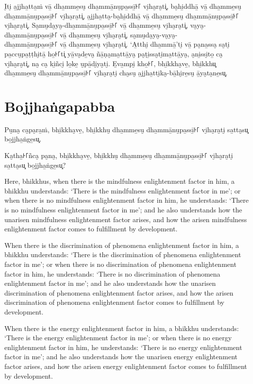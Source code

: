 I̮ti̮ a̱jjha̱tta̱ṁ vā̱ dha̱mme̱su̮ dha̱mmā̱nu̮pa̱ssī̱꜔꜒ vi̮ha̮ra̮ti͓,
ba̮hi̱ddhā̱ vā̱ dha̱mme̱su̮ dha̱mmā̱nu̮pa̱ssī̱꜔꜒ vi̮ha̮ra̮ti͓,
a̱jjha̱tta̮-ba̮hi̱ddhā̱ vā̱ dha̱mme̱su̮ dha̱mmā̱nu̮pa̱ssī̱꜔꜒ vi̮ha̮ra̮ti͓.
Sa̮mu̮da̮ya̮-dha̱mmā̱nu̮pa̱ssī̱꜔꜒ vā̱ dha̱mme̱su̮ vi̮ha̮ra̮ti͓,
va̮ya̮-dha̱mmā̱nu̮pa̱ssī̱꜔꜒ vā̱ dha̱mme̱su̮ vi̮ha̮ra̮ti͓,
sa̮mu̮da̮ya̮-va̮ya̮-\\ dha̱mmā̱nu̮pa̱ssī̱꜔꜒ vā̱ dha̱mme̱su̮ vi̮ha̮ra̮ti͓.
‘A̱tthi̮ dha̱mmā̱’ti̮ vā̱ pa̮na̱ssa̮ sa̮ti̮ pa̱ccu̮pa̱ṭṭhi̮tā̱ ho̱꜔꜒ti͓
yā̱va̮de̱va̮ ñā̱ṇa̮ma̱ttā̱ya̮ pa̮ṭi̱ssa̮ti̮ma̱ttā̱ya̮, a̮ni̱ssi̮to̱ ca̮ vi̮ha̮ra̮ti͓,
na̮ ca̮ ki̱ñci̮ lo̱ke̱ u̮pā̱di̮ya̮ti̮. E̱va̱mpi̮ kho̱꜔꜒, bhi̱kkha̮ve̱, bhi̱kkhu͓
dha̱mme̱su̮ dha̱mmā̱nu̮pa̱ssī̱꜔꜒ vi̮ha̮ra̮ti̮ cha̮su̮ a̱jjha̱tti̮ka̮-bā̱hi̮re̱su̮ ā̱ya̮ta̮ne̱su͓.


\section*{Bojjhaṅgapabba}

Pu̮na̮ ca̮pa̮ra̱ṁ, bhi̱kkha̮ve̱, bhi̱kkhu̮ dha̱mme̱su̮ dha̱mmā̱nu̮pa̱ssī̱꜔꜒ vi̮ha̮ra̮ti̮ sa̱tta̮su͓
bo̱jjha̱ṅge̱su͓.

Ka̮tha̱꜔꜒ñca̮ pa̮na̮, bhi̱kkha̮ve̱, bhi̱kkhu̮ dha̱mme̱su̮ dha̱mmā̱nu̮pa̱ssī̱꜔꜒ vi̮ha̮ra̮ti̮ sa̱tta̮su͓
bo̱jjha̱ṅge̱su͓?

\englishPage

Here, bhikkhus, when there is the mindfulness enlightenment factor in him, a
bhikkhu understands: `There is the mindfulness enlightenment factor in me'; or
when there is no mindfulness enlightenment factor in him, he understands: `There
is no mindfulness enlightenment factor in me'; and he also understands how the
unarisen mindfulness enlightenment factor arises, and how the arisen mindfulness
enlightenment factor comes to fulfillment by development.

When there is the discrimination of phenomena enlightenment factor in him, a
bhikkhu understands: `There is the discrimination of phenomena enlightenment
factor in me'; or when there is no discrimination of phenomena enlightenment
factor in him, he understands: `There is no discrimination of phenomena
enlightenment factor in me'; and he also understands how the unarisen
discrimination of phenomena enlightenment factor arises, and how the arisen
discrimination of phenomena enlightenment factor comes to fulfillment by
development.

When there is the energy enlightenment factor in him, a bhikkhu understands:
`There is the energy enlightenment factor in me'; or when there is no energy
enlightenment factor in him, he understands: `There is no energy enlightenment
factor in me'; and he also understands how the unarisen energy enlightenment
factor arises, and how the arisen energy enlightenment factor comes to
fulfillment by development.

